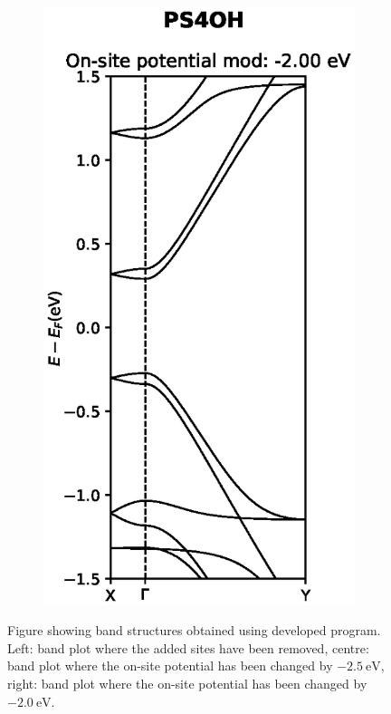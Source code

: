\begin{figure}[h]
\begin{subfigure}[b]{0.25\textwidth}
    \centering
    \includegraphics[width=\textwidth]{Figures/PS4OHmod2.eps}
    \label{PS4OHdevmod2}
    \end{subfigure}
    \vspace{-2\baselineskip}
    \caption{Figure showing band structures obtained using developed program. Left: band plot where the added sites have been removed, centre: band plot where the on-site potential has been changed by \(\SI{-2.5}{\electronvolt}\), right: band plot where the on-site potential has been changed by \(\SI{-2.0}{\electronvolt}\).} 
    \label{PS4OHdev}
\end{figure}
